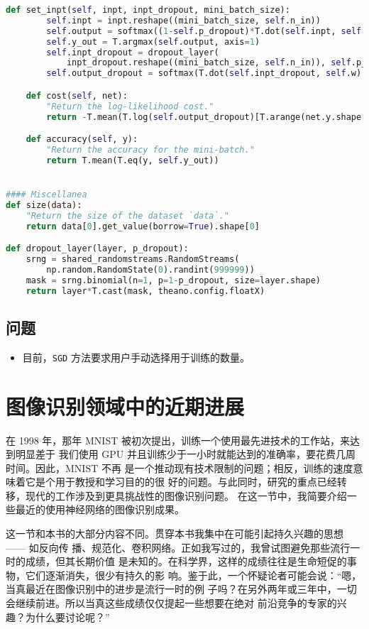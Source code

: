 \begin{lstlisting}[language=Python]
    def set_inpt(self, inpt, inpt_dropout, mini_batch_size):
        self.inpt = inpt.reshape((mini_batch_size, self.n_in))
        self.output = softmax((1-self.p_dropout)*T.dot(self.inpt, self.w) + self.b)
        self.y_out = T.argmax(self.output, axis=1)
        self.inpt_dropout = dropout_layer(
            inpt_dropout.reshape((mini_batch_size, self.n_in)), self.p_dropout)
        self.output_dropout = softmax(T.dot(self.inpt_dropout, self.w) + self.b)

    def cost(self, net):
        "Return the log-likelihood cost."
        return -T.mean(T.log(self.output_dropout)[T.arange(net.y.shape[0]), net.y])

    def accuracy(self, y):
        "Return the accuracy for the mini-batch."
        return T.mean(T.eq(y, self.y_out))


#### Miscellanea
def size(data):
    "Return the size of the dataset `data`."
    return data[0].get_value(borrow=True).shape[0]

def dropout_layer(layer, p_dropout):
    srng = shared_randomstreams.RandomStreams(
        np.random.RandomState(0).randint(999999))
    mask = srng.binomial(n=1, p=1-p_dropout, size=layer.shape)
    return layer*T.cast(mask, theano.config.floatX)
\end{lstlisting}

\subsection*{问题}

\begin{itemize}
\item 目前，\lstinline!SGD! 方法要求用户手动选择用于训练\epochs{}的数量。
\end{itemize}

\section{图像识别领域中的近期进展}
\label{sec:recent_progress_in_image_recognition}

在 1998 年，那年 MNIST 被初次提出，训练一个使用最先进技术的工作站，来达到明显差于
我们使用 GPU 并且训练少于一小时就能达到的准确率，要花费几周时间。因此，MNIST 不再
是一个推动现有技术限制的问题；相反，训练的速度意味着它是个用于教授和学习目的的很
好的问题。与此同时，研究的重点已经转移，现代的工作涉及到更具挑战性的图像识别问题。
在这一节中，我简要介绍一些最近的使用神经网络的图像识别成果。

这一节和本书的大部分内容不同。贯穿本书我集中在可能引起持久兴趣的思想 —— 如反向传
播、规范化、卷积网络。正如我写过的，我曾试图避免那些流行一时的成绩，但其长期价值
是未知的。在科学界，这样的成绩往往是生命短促的事物，它们逐渐消失，很少有持久的影
响。鉴于此，一个怀疑论者可能会说：“嗯，当真最近在图像识别中的进步是流行一时的例
子吗？在另外两年或三年中，一切会继续前进。所以当真这些成绩仅仅提起一些想要在绝对
前沿竞争的专家的兴趣？为什么要讨论呢？”

